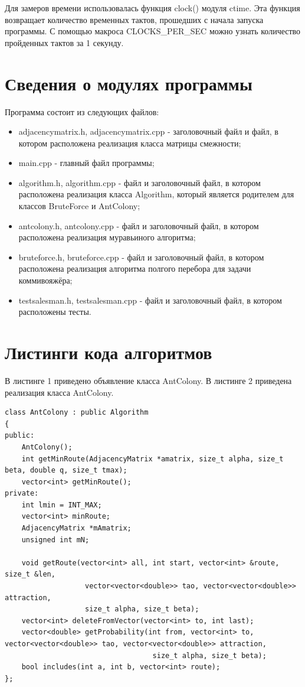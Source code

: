 \documentclass[a4paper,14pt]{report}
\begin{document}
Для замеров времени использовалась функция clock() модуля ctime. Эта функция возвращает количество временных тактов, прошедших с начала запуска программы.
С помощью макроса CLOCKS\_PER\_SEC можно узнать количество пройденных тактов за 1 секунду.

\section*{Сведения о модулях программы}

Программа состоит из следующих файлов:
\begin{itemize}
	\item adjacencymatrix.h, adjacencymatrix.cpp - заголовочный файл и файл, в котором расположена реализация класса матрицы смежности;
	\item main.cpp - главный файл программы;
	\item algorithm.h, algorithm.cpp - файл и заголовочный файл, в котором расположена реализация класса Algorithm, который является родителем для классов BruteForce и AntColony;
	\item antcolony.h, antcolony.cpp - файл и заголовочный файл, в котором расположена реализация муравьиного алгоритма;
	\item bruteforce.h, bruteforce.cpp - файл и заголовочный файл, в котором расположена реализация алгоритма полгого перебора для задачи коммивояжёра;
	\item testsalesman.h, testsalesman.cpp - файл и заголовочный файл, в котором расположены тесты.
\end{itemize}

\section*{Листинги кода алгоритмов}

В листинге 1 приведено объявление класса AntColony. В листинге 2 приведена реализация класса AntColony.

\begin{lstlisting}[label=some-code,caption=Объявление класса AntColony]
class AntColony : public Algorithm
{
public:
    AntColony();
    int getMinRoute(AdjacencyMatrix *amatrix, size_t alpha, size_t beta, double q, size_t tmax);
    vector<int> getMinRoute();
private:
    int lmin = INT_MAX;
    vector<int> minRoute;
    AdjacencyMatrix *mAmatrix;
    unsigned int mN;

    void getRoute(vector<int> all, int start, vector<int> &route, size_t &len,
                   vector<vector<double>> tao, vector<vector<double>> attraction,
                   size_t alpha, size_t beta);
    vector<int> deleteFromVector(vector<int> to, int last);
    vector<double> getProbability(int from, vector<int> to, vector<vector<double>> tao, vector<vector<double>> attraction,
                                   size_t alpha, size_t beta);
    bool includes(int a, int b, vector<int> route);
};
\end{lstlisting}
\end{document}
